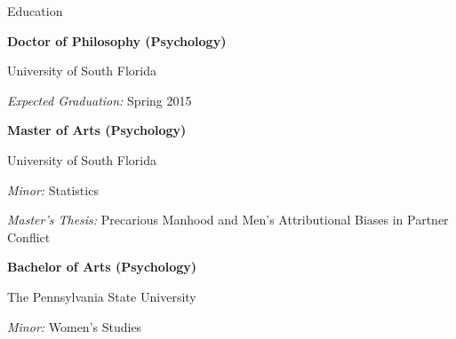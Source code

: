 \begin{rubric}{Education}

\textbf{Doctor of Philosophy (Psychology)} \par University of South Florida \par \textit{Expected Graduation:} Spring 2015

\entry*[July 2012] 
\textbf{Master of Arts (Psychology)} \par University of South Florida \par \textit{Minor:} Statistics \par \textit{Master's Thesis:} Precarious Manhood and Men’s Attributional Biases in Partner Conflict 

\entry*[May 2009] 
\textbf{Bachelor of Arts (Psychology)} \par The Pennsylvania State University \par
\textit{Minor:} Women's Studies

\end{rubric}
